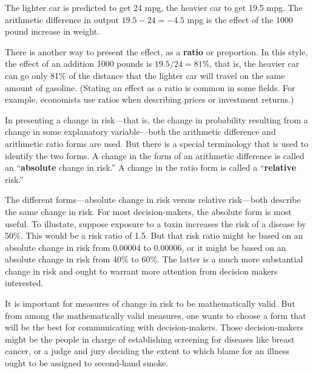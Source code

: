 \documentclass[
  letterpaper,
  DIV=11,
  numbers=noendperiod,
  oneside]{scrreprt}
\begin{document}
{\begin{footnotesize}
The lighter car is predicted to get 24 mpg, the heavier car to get 19.5
mpg. The arithmetic difference in output \(19.5 - 24 = -4.5\) mpg is the
effect of the 1000 pound increase in weight.

There is another way to present the effect, as a \textbf{ratio} or
proportion. In this style, the effect of an addition 1000 pounds is
\(19.5 / 24 = 81\%\), that is, the heavier car can go only 81\% of the
distance that the lighter car will travel on the same amount of
gasoline. (Stating an effect as a ratio is common in some fields. For
example, economists use ratios when describing prices or investment
returns.)

In presenting a change in risk---that is, the change in probability
resulting from a change in some explanatory variable---both the
arithmetic difference and arithmetic ratio forms are used. But there is
a special terminology that is used to identify the two forms. A change
in the form of an arithmetic difference is called an ``\textbf{absolute}
change in risk.'' A change in the ratio form is called a
``\textbf{relative} risk.''

The different forms---absolute change in risk versus relative
risk---both describe the same change in risk. For most decision-makers,
the absolute form is most useful. To illustate, suppose exposure to a
toxin increases the risk of a disease by 50\%. This would be a risk
ratio of 1.5. But that risk ratio might be based on an absolute change
in risk from 0.00004 to 0.00006, or it might be based on an absolute
change in risk from 40\% to 60\%. The latter is a much more substantial
change in risk and ought to warrant more attention from decision makers
interested.

\begin{tcolorbox}[enhanced jigsaw, colbacktitle=quarto-callout-note-color!10!white, breakable, opacitybacktitle=0.6, colback=white, left=2mm, arc=.35mm, colframe=quarto-callout-note-color-frame, coltitle=black, toprule=.15mm, opacityback=0, leftrule=.75mm, bottomtitle=1mm, toptitle=1mm, titlerule=0mm, title=\textcolor{quarto-callout-note-color}{\faInfo}\hspace{0.5em}{Other ways to measure change in risk}, rightrule=.15mm, bottomrule=.15mm]

It is important for measures of change in risk to be mathematically
valid. But from among the mathematically valid measures, one wants to
choose a form that will be the best for communicating with
decision-makers. Those decision-makers might be the people in charge of
establishing screening for diseases like breast cancer, or a judge and
jury deciding the extent to which blame for an illness ought to be
assigned to second-hand smoke.


\end{tcolorbox}
\end{footnotesize}}
\end{document}
